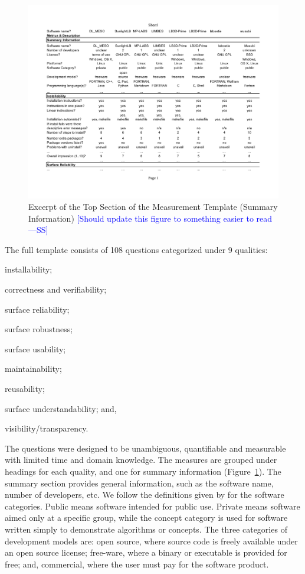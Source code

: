 \documentclass[final, 3p, times, authoryear]{elsarticle}
\newcommand{\authornote}[3]{\textcolor{#1}{[#3 ---#2]}}
\newcommand{\authornote}[3]{}
\newcommand{\wss}[1]{\authornote{blue}{SS}{#1}} %
\begin{document}
\begin{figure}[!ht]
	\begin{center}
	  \includegraphics[width=1.0\textwidth]{./figures/measurement_template}
	  \caption{Excerpt of the Top Section of the Measurement Template (Summary
	  Information) \wss{Should update this figure to something easier to read}}
	  \label{measurement_template_image}
	\end{center}
\end{figure}

The full template consists of 108 questions categorized under 9 qualities:
\begin{inparaenum}
	\item installability;
	\item correctness and verifiability;
	\item surface reliability;
	\item surface robustness;
	\item surface usability;
	\item maintainability;
	\item reusability;
	\item surface understandability; and,
	\item visibility/transparency. 
\end{inparaenum} 
The questions were designed to be unambiguous, quantifiable and measurable with
limited time and domain knowledge. The measures are grouped under headings for
each quality, and one for summary information
(Figure~\ref{measurement_template_image}).   The summary section provides
general information, such as the software name, number of developers, etc.  We
follow the definitions given by \citet{gewaltig2012quality} for the software
categories.  Public means software intended for public use.  Private means
software aimed only at a specific group, while the concept category is used for
software written simply to demonstrate algorithms or concepts. The three
categories of development models are: open source, where source code is freely
available under an open source license; free-ware, where a binary or executable
is provided for free; and, commercial, where the user must pay for the software
product.  
\end{document}
